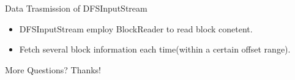 \documentclass{beamer}
\begin{document}
\begin{frame}{Data Trasmission of DFSInputStream}
\begin{itemize}[<+->]
\item DFSInputStream employ BlockReader to read block conetent.
\item Fetch several block information each time(within a certain offset range).
\end{itemize}
\end{frame}

\begin{frame}{More Questions?}
Thanks!
\end{frame}
\end{document}

